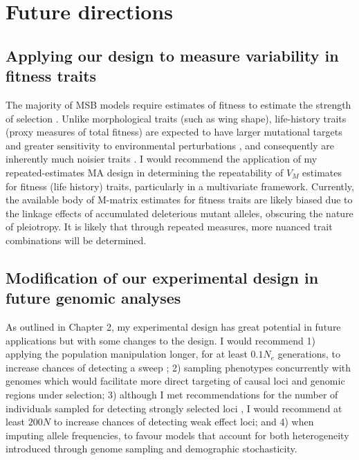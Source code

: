\section{Future directions}
\subsection{Applying our design to measure variability in fitness traits}

The majority of MSB models require estimates of fitness to estimate the strength of selection \citep{Wals18c28}.   Unlike morphological traits (such as wing shape), 
life-history traits (proxy measures of total fitness) are expected to have larger mutational targets and greater sensitivity to environmental perturbations \citep{Houl96, Houl98},  and consequently are inherently much noisier traits \citep{Lync98c12,Wals18c28}.  I would recommend the application of my repeated-estimates MA design in determining the repeatability of $V_M$ estimates for fitness (life history) traits, particularly in a multivariate framework. Currently, the available body of M-matrix estimates for fitness traits are likely biased due to the linkage effects of accumulated deleterious mutant alleles, obscuring the nature of pleiotropy. It is likely that through repeated measures, more nuanced trait combinations will be determined. \par

\subsection{Modification of our experimental design in future genomic analyses}
As outlined in Chapter 2, my experimental design has great potential in future applications but with some changes to the design. I would recommend 1) applying the population manipulation longer, for at least $0.1N_e$ generations, to increase chances of detecting a sweep \citep{Wals18c9}; 2) sampling phenotypes concurrently with genomes which would facilitate more direct targeting of causal loci and genomic regions under selection; 3) although I met recommendations for the number of individuals sampled for detecting strongly selected loci \citep[$50N$,][]{Schl15}, I would recommend at least $200N$ to increase chances of detecting weak effect loci; and 4) when imputing allele frequencies, to favour models that account for both heterogeneity introduced through genome sampling and demographic stochasticity.\par

